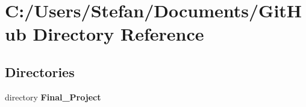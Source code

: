 \section{C\-:/\-Users/\-Stefan/\-Documents/\-Git\-Hub Directory Reference}
\label{dir_137b073837595efb536a7354aa7b9f36}
\subsection*{Directories}
\begin{DoxyCompactItemize}
\item 
directory {\bf Final\-\_\-\-Project}
\end{DoxyCompactItemize}
